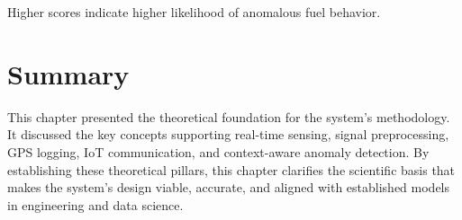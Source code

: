 \vspace{0.5em}
Higher scores indicate higher likelihood of anomalous fuel behavior.

\section{Summary}

This chapter presented the theoretical foundation for the system’s methodology. It discussed the key concepts supporting real-time sensing, signal preprocessing, GPS logging, IoT communication, and context-aware anomaly detection. By establishing these theoretical pillars, this chapter clarifies the scientific basis that makes the system’s design viable, accurate, and aligned with established models in engineering and data science.
